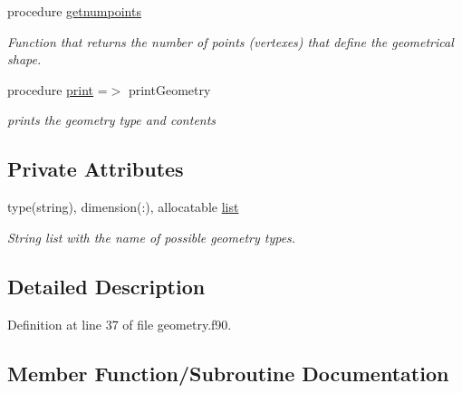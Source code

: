 \begin{DoxyCompactItemize}
procedure \mbox{\hyperlink{structgeometry__mod_1_1geometry__class_a8988388d683fbf7e5727a39b71d3c479}{getnumpoints}}
\begin{DoxyCompactList}\small\item\em Function that returns the number of points (vertexes) that define the geometrical shape. \end{DoxyCompactList}\item 
procedure \mbox{\hyperlink{structgeometry__mod_1_1geometry__class_afbb83bea5cd3f73708b448d3c732ea7c}{print}} =$>$ print\+Geometry
\begin{DoxyCompactList}\small\item\em prints the geometry type and contents \end{DoxyCompactList}\end{DoxyCompactItemize}
\subsection*{Private Attributes}
\begin{DoxyCompactItemize}
\item 
type(string), dimension(\+:), allocatable \mbox{\hyperlink{structgeometry__mod_1_1geometry__class_a218ff308d9bb94f4386573d7329babc6}{list}}
\begin{DoxyCompactList}\small\item\em String list with the name of possible geometry types. \end{DoxyCompactList}\end{DoxyCompactItemize}


\subsection{Detailed Description}


Definition at line 37 of file geometry.\+f90.



\subsection{Member Function/\+Subroutine Documentation}
\mbox{\label{structgeometry__mod_1_1geometry__class_a435975f73e28fc8c9f04b47c390cb089}} 
